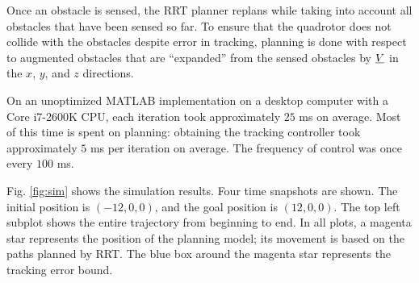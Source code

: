 Once an obstacle is sensed, the RRT planner replans while taking into account all obstacles that have been sensed so far. To ensure that the quadrotor does not collide with the obstacles despite error in tracking, planning is done with respect to augmented obstacles that are ``expanded'' from the sensed obstacles by $\underline{V}$ in the $x$, $y$, and $z$ directions.

On an unoptimized MATLAB implementation on a desktop computer with a Core i7-2600K CPU, each iteration took approximately $25$ ms on average. Most of this time is spent on planning: obtaining the tracking controller took approximately $5$ ms per iteration on average. The frequency of control was once every $100$ ms.

Fig. \ref{fig:sim} shows the simulation results. Four time snapshots are shown. The initial position is $(-12, 0, 0)$, and the goal position is $(12, 0, 0)$. The top left subplot shows the entire trajectory from beginning to end. In all plots, a magenta star represents the position of the planning model; its movement is based on the paths planned by RRT. The blue box around the magenta star represents the tracking error bound.
